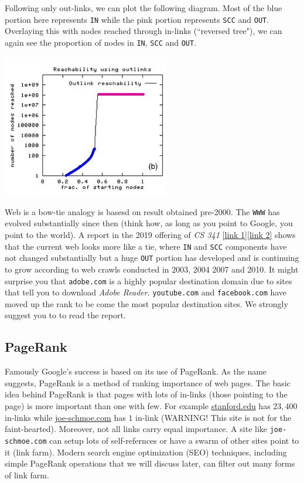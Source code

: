Following only out-links, we can plot the following diagram. Most of the blue portion here represents \texttt{IN} while the pink portion represents \texttt{SCC} and \texttt{OUT}. Overlaying this with nodes reached through in-links (``reversed tree"), we can again see the proportion of nodes in \texttt{IN}, \texttt{SCC} and \texttt{OUT}. 

{
\centering
\includegraphics[width=0.55\textwidth]{notes/img/l11_p16_reachable.JPG} \par
}

Web is a bow-tie analogy is basesd on result obtained pre-2000. The \texttt{WWW} has evolved substantially since then (think how, as long as you point to Google, you point to the world). A report in the 2019 offering of \textit{CS 341} \href{https://web.stanford.edu/class/cs341/project/Kang_slides.pdf}{[link 1]}\href{https://web.stanford.edu/class/cs341/project/Kang_report.pdf}{[link 2]} shows that the current web looks more like a tie, where \texttt{IN} and \texttt{SCC} components have not changed substantially but a huge \texttt{OUT} portion has developed and is continuing to grow according to web crawls conducted in 2003, 2004 2007 and 2010. It might surprise you that \texttt{adobe.com} is a highly popular destination domain due to sites that tell you to download \textit{Adobe Reader}. \texttt{youtube.com} and \texttt{facebook.com} have moved up the rank to be come the most popular destination sites. We strongly suggest you to to read the report.

\subsection{PageRank}

Famously Google's success is based on its use of PageRank. As the name suggests, PageRank is a method of ranking importance of web pages. The basic idea behind PageRank is that pages with lots of in-links (those pointing to the page) is more important than one with few. For example \href{www.stanford.edu}{stanford.edu} has $23,400$ in-links while \href{www.joe-schmoe.com}{joe-schmoe.com} has $1$ in-link (WARNING! This site is not for the faint-hearted). Moreover, not all links carry equal importance. A site like \texttt{joe-schmoe.com} can setup lots of self-refernces or have a swarm of other sites point to it (link farm). Modern search engine optimization (SEO) techniques, including simple PageRank operations that we will discuss later, can filter out many forms of link farm.

